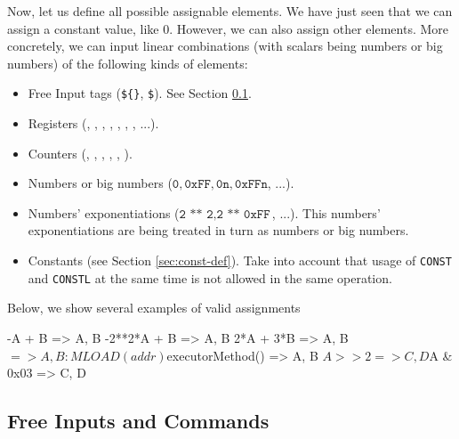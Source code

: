 Now, let us define all possible assignable elements. We have just seen that we can assign a constant value, like $0$. However, we can also assign other elements. More concretely, we can input linear combinations (with scalars being numbers or big numbers) of the following kinds of elements:

\begin{itemize}

\item Free Input tags (\texttt{\$\{\}}, \texttt{\$}). See Section \ref{sec:free-inputs}.

\item Registers (\A, \B, \C, \D, \E, \SP, \RR, ...).

\item Counters (\CNTARITH, \CNTBINARY, \CNTKECCAKF, \CNTMEMALIGN, \CNTPADDINGPG, \CNTPOSEIDONG). 

\item Numbers or big numbers ($\texttt{0}, \texttt{0xFF}, \texttt{0n}, \texttt{0xFFn}$, ...). 

\item Numbers' exponentiations ($\texttt{2 ** 2}, \texttt{2 ** 0xFF}$, ...). This numbers' exponentiations are being treated in turn as numbers or big numbers. 

\item Constants (see Section \ref{sec:const-def}). Take into account that usage of \texttt{CONST} and \texttt{CONSTL} at the same time is not allowed in the same operation.


\end{itemize}

Below, we show several examples of valid assignments

\begin{zkasm}
-A + B => A, B
-2**2*A + B => A, B
2*A + 3*B => A, B
$ => A, B				:MLOAD(addr)
${executorMethod()} => A, B
${A >> 2} => C, D
${A & 0x03} => C, D
\end{zkasm}








\subsection{Free Inputs and Commands} \label{sec:free-inputs}

